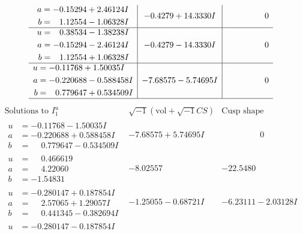 \documentclass[1p]{elsarticle_modified}
\theoremstyle{definition}
\newcommand{\I}{\sqrt{-1}}
\begin{document}
$$\begin{array}{c|c|c}
\begin{aligned}
a &= -0.15294 + 2.46124 I \\
b &= \phantom{-}1.12554 - 1.06328 I\end{aligned}
 & -0.4279 + 14.3330 I & \phantom{-0.000000 } 0 \\ \hline\begin{aligned}
u &= \phantom{-}0.38534 - 1.38238 I \\
a &= -0.15294 - 2.46124 I \\
b &= \phantom{-}1.12554 + 1.06328 I\end{aligned}
 & -0.4279 - 14.3330 I & \phantom{-0.000000 } 0 \\ \hline\begin{aligned}
u &= -0.11768 + 1.50035 I \\
a &= -0.220688 - 0.588458 I \\
b &= \phantom{-}0.779647 + 0.534509 I\end{aligned}
 & -7.68575 - 5.74695 I & \phantom{-0.000000 } 0\\
 \hline 
 \end{array}$$\newpage$$\begin{array}{c|c|c}  
\text{Solutions to }I^u_{1}& \I (\text{vol} + \sqrt{-1}CS) & \text{Cusp shape}\\
 \hline 
\begin{aligned}
u &= -0.11768 - 1.50035 I \\
a &= -0.220688 + 0.588458 I \\
b &= \phantom{-}0.779647 - 0.534509 I\end{aligned}
 & -7.68575 + 5.74695 I & \phantom{-0.000000 } 0 \\ \hline\begin{aligned}
u &= \phantom{-}0.466619\phantom{ +0.000000I} \\
a &= \phantom{-}4.22060\phantom{ +0.000000I} \\
b &= -1.54831\phantom{ +0.000000I}\end{aligned}
 & -8.02557\phantom{ +0.000000I} & -22.5480\phantom{ +0.000000I} \\ \hline\begin{aligned}
u &= -0.280147 + 0.187854 I \\
a &= \phantom{-}2.57065 + 1.29057 I \\
b &= \phantom{-}0.441345 - 0.382694 I\end{aligned}
 & -1.25055 - 0.68721 I & -6.23111 - 2.03128 I \\ \hline\begin{aligned}
u &= -0.280147 - 0.187854 I \\

\end{aligned}
\end{array}$$
\end{document}
